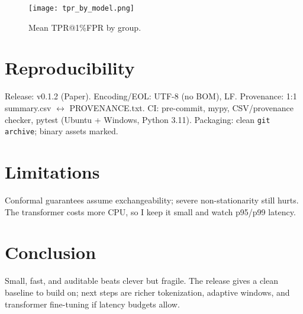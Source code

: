 \documentclass[11pt,twocolumn]{article}
\begin{document}


\begin{figure}[h]
\centering
\texttt{[image: tpr\_by\_model.png]}
\caption{Mean TPR@1\%FPR by group.}
\label{fig:tpr}
\end{figure}


\section{Reproducibility}
Release: v0.1.2 (Paper). Encoding/EOL: UTF-8 (no BOM), LF. Provenance: 1:1 summary.csv $\leftrightarrow$ PROVENANCE.txt.
CI: pre-commit, mypy, CSV/provenance checker, pytest (Ubuntu + Windows, Python 3.11). Packaging: clean \texttt{git archive}; binary assets marked.

\section{Limitations}
Conformal guarantees assume exchangeability; severe non-stationarity still hurts.
The transformer costs more CPU, so I keep it small and watch p95/p99 latency.

\section{Conclusion}
Small, fast, and auditable beats clever but fragile. The release gives a clean baseline to build on; next steps are richer tokenization,
adaptive windows, and transformer fine-tuning if latency budgets allow.

\balance


\end{document}
